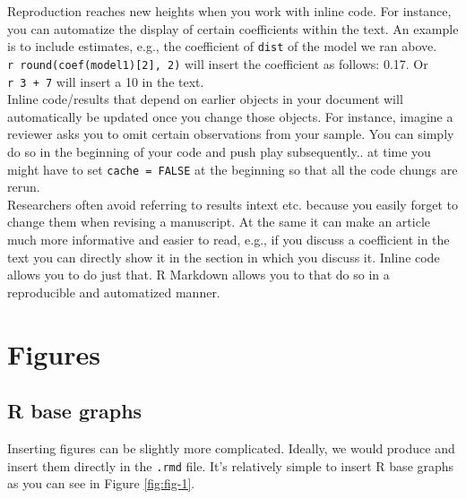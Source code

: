 \documentclass[12pt,]{article}
\newenvironment{Shaded}{\begin{snugshade}}{\end{snugshade}}
\newcommand{\KeywordTok}[1]{\textcolor[rgb]{0.13,0.29,0.53}{\textbf{#1}}}
\newcommand{\OperatorTok}[1]{\textcolor[rgb]{0.81,0.36,0.00}{\textbf{#1}}}
\newcommand{\NormalTok}[1]{#1}
\theoremstyle{definition}
\theoremstyle{definition}
\theoremstyle{definition}
\theoremstyle{remark}
\begin{document}
Reproduction reaches new heights when you work with inline code. For
instance, you can automatize the display of certain coefficients within
the text. An example is to include estimates, e.g., the coefficient of
\texttt{dist} of the model we ran above.
\texttt{\textasciigrave{}r\ round(coef(model1){[}2{]},\ 2)\textasciigrave{}}
will insert the coefficient as follows: 0.17. Or
\texttt{\textasciigrave{}r\ 3\ +\ 7\textasciigrave{}} will insert a 10
in the text.\\
Inline code/results that depend on earlier objects in your document will
automatically be updated once you change those objects. For instance,
imagine a reviewer asks you to omit certain observations from your
sample. You can simply do so in the beginning of your code and push play
subsequently.. at time you might have to set \texttt{cache\ =\ FALSE} at
the beginning so that all the code chungs are rerun.\\
Researchers often avoid referring to results intext etc. because you
easily forget to change them when revising a manuscript. At the same it
can make an article much more informative and easier to read, e.g., if
you discuss a coefficient in the text you can directly show it in the
section in which you discuss it. Inline code allows you to do just that.
R Markdown allows you to that do so in a reproducible and automatized
manner.

\section{Figures}\label{figures}

\subsection{R base graphs}\label{r-base-graphs}

Inserting figures can be slightly more complicated. Ideally, we would
produce and insert them directly in the \texttt{.rmd} file. It's
relatively simple to insert R base graphs as you can see in Figure
\ref{fig:fig-1}.

\begin{Shaded}
\end{Shaded}
\end{document}
